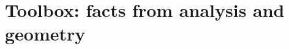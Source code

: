 %
%
%     
%

\makeatletter
\providecommand{\E}{\mathbb E}
\providecommand{\Pp}{\mathbb P}
\providecommand{\R}{\mathbb R}
\providecommand{\tr}{\operatorname{tr}}
\providecommand{\op}{\mathrm{op}}
\providecommand{\norm}[1]{\left\lVert#1\right\rVert}
\providecommand{\ind}{\mathbf 1}
\providecommand{\dd}{\,d}
\providecommand{\Hh}{H_2}
\providecommand{\surf}{\mathcal J}
\providecommand{\relint}{\operatorname{relint}}
\providecommand{\aff}{\operatorname{aff}}
\providecommand{\cone}{\operatorname{cone}}
\providecommand{\dist}{\operatorname{dist}}
\providecommand{\prj}{\operatorname{pr}}
\providecommand{\Haus}{\mathcal H}
\providecommand{\TBc}[1]{[#1]}
\providecommand{\PN}[2]{\ifdefined\toolboxinpaper\ref{#1}\else#2\fi}
\providecommand{\PR}[3]{#1~\PN{#2}{#3}}
\providecommand{\PE}[2]{(\PN{#1}{#2})}
\providecommand{\usedin}[1]{\par\smallskip\noindent{\small\emph{Used in:} #1}\par\smallskip}
\makeatother

\section{Toolbox: facts from analysis and geometry}\label{app:toolbox}

